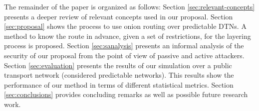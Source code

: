 The remainder of the paper is organized as follows: Section \ref{sec:relevant-concepts} presents a deeper review of relevant concepts used in our proposal. Section \ref{sec:proposal} shows the process to use onion routing over predictable DTNs. A method to know the route in advance, given a set of restrictions, for the layering process is proposed. Section \ref{sec:sanalysis} presents an informal analysis of the security of our proposal from the point of view of passive and active attackers. Section \ref{sec:evaluation} presents the results of our simulation over a public transport network (considered predictable networks). This results show the performance of our method in terms of different statistical metrics. Section \ref{sec:conclusions} provides concluding remarks as well as possible future research work.
